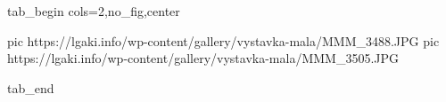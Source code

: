  
 
 
 
 


\ifcmt
  tab_begin cols=2,no_fig,center

     pic https://lgaki.info/wp-content/gallery/vystavka-mala/MMM_3488.JPG
		 pic https://lgaki.info/wp-content/gallery/vystavka-mala/MMM_3505.JPG

  tab_end
\fi
